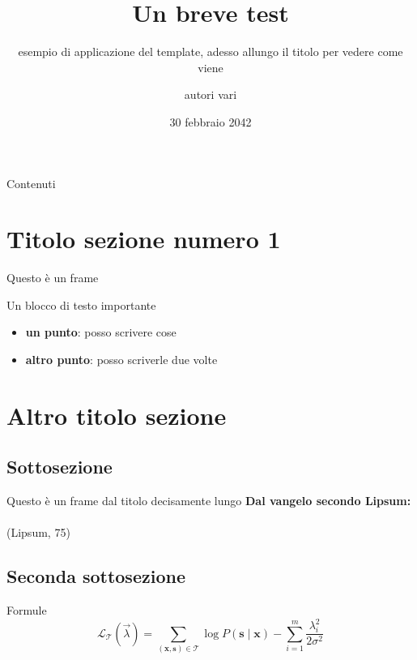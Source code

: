 \documentclass{beamer}
\title{Un breve test}
\subtitle{esempio di applicazione del template, adesso allungo il titolo per vedere come viene}
\author{autori vari}
\institute{Università di Trento}
\date{30 febbraio 2042}
\begin{document}

\begin{frame}[fragile]
  \titlepage
\end{frame}

\begin{frame}{Contenuti}
  \tableofcontents
\end{frame}

\section{Titolo sezione numero 1}

\begin{frame}{Questo è un frame}
    \begin{block}{Un blocco di testo importante}
        \lipsum[66]
    \end{block}
    \pause
    \begin{itemize}
      \item \textbf{un punto}: posso scrivere cose
      \pause
      \item \textbf{altro punto}: posso scriverle due volte
    \end{itemize}
\end{frame}

\section{Altro titolo sezione}
\subsection{Sottosezione}
\begin{frame}{Questo è un frame dal titolo decisamente lungo}
    \textbf{Dal vangelo secondo Lipsum:} \\
    \pause
    \textit{\lipsum[75]} \\ 
    (Lipsum, 75)
\end{frame}

\subsection{Seconda sottosezione}

\begin{frame}{Formule}
    \[
    \mathcal L_{\mathcal T}(\vec{\lambda})
    = \sum_{(\mathbf{x},\mathbf{s})\in \mathcal T}
       \log P(\mathbf{s}\mid\mathbf{x}) - \sum_{i=1}^m
       \frac{\lambda_i^2}{2\sigma^2}
    \]
\end{frame}
\end{document}
